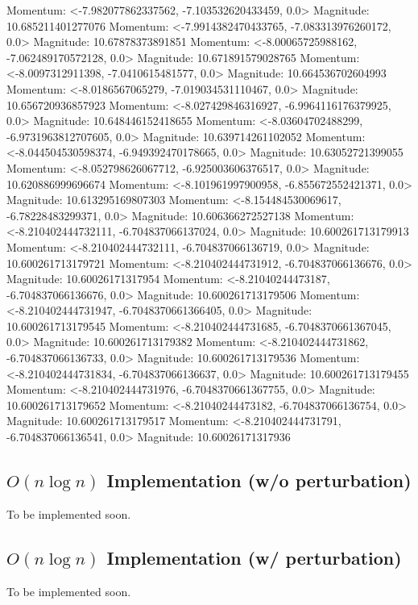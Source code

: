 \documentclass[10pt]{article}
\begin{document}
Momentum: <-7.982077862337562, -7.103532620433459, 0.0> Magnitude: 10.685211401277076
Momentum: <-7.9914382470433765, -7.083313976260172, 0.0> Magnitude: 10.67878373891851
Momentum: <-8.00065725988162, -7.062489170572128, 0.0> Magnitude: 10.671891579028765
Momentum: <-8.0097312911398, -7.0410615481577, 0.0> Magnitude: 10.664536702604993
Momentum: <-8.0186567065279, -7.019034531110467, 0.0> Magnitude: 10.656720936857923
Momentum: <-8.027429846316927, -6.9964116176379925, 0.0> Magnitude: 10.648446152418655
Momentum: <-8.03604702488299, -6.9731963812707605, 0.0> Magnitude: 10.639714261102052
Momentum: <-8.044504530598374, -6.949392470178665, 0.0> Magnitude: 10.63052721399055
Momentum: <-8.052798626067712, -6.925003606376517, 0.0> Magnitude: 10.620886999696674
Momentum: <-8.101961997900958, -6.855672552421371, 0.0> Magnitude: 10.613295169807303
Momentum: <-8.154484530069617, -6.78228483299371, 0.0> Magnitude: 10.606366272527138
Momentum: <-8.210402444732111, -6.704837066137024, 0.0> Magnitude: 10.600261713179913
Momentum: <-8.210402444732111, -6.704837066136719, 0.0> Magnitude: 10.600261713179721
Momentum: <-8.210402444731912, -6.704837066136676, 0.0> Magnitude: 10.60026171317954
Momentum: <-8.21040244473187, -6.704837066136676, 0.0> Magnitude: 10.600261713179506
Momentum: <-8.210402444731947, -6.7048370661366405, 0.0> Magnitude: 10.600261713179545
Momentum: <-8.210402444731685, -6.7048370661367045, 0.0> Magnitude: 10.600261713179382
Momentum: <-8.210402444731862, -6.704837066136733, 0.0> Magnitude: 10.600261713179536
Momentum: <-8.210402444731834, -6.704837066136637, 0.0> Magnitude: 10.600261713179455
Momentum: <-8.210402444731976, -6.7048370661367755, 0.0> Magnitude: 10.600261713179652
Momentum: <-8.21040244473182, -6.704837066136754, 0.0> Magnitude: 10.600261713179517
Momentum: <-8.210402444731791, -6.704837066136541, 0.0> Magnitude: 10.60026171317936

\subsection{$O(n \log n)$ Implementation (w/o perturbation)}
To be implemented soon.
\subsection{$O(n \log n)$ Implementation (w/ perturbation)}
To be implemented soon.
\end{document}
